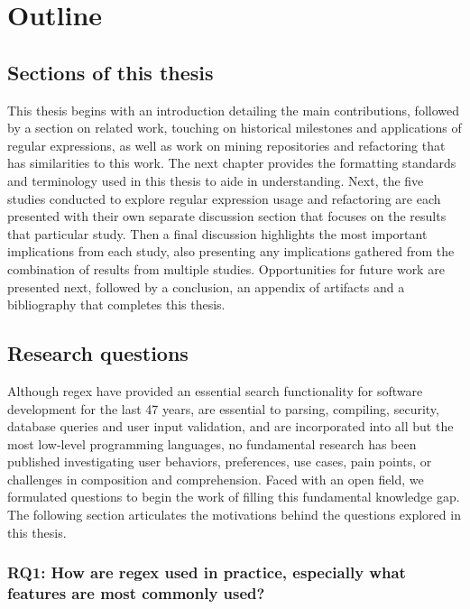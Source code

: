 \section{Outline}

\subsection{Sections of this thesis}
This thesis begins with an introduction detailing the main contributions, followed by a section on related work, touching on historical milestones and applications of regular expressions, as well as work on mining repositories and refactoring that has similarities to this work. The next chapter provides the formatting standards and terminology used in this thesis to aide in understanding.  Next, the five studies conducted to explore regular expression usage and refactoring are each presented with their own separate discussion section that focuses on the results that particular study.  Then a final discussion highlights the most important implications from each study, also presenting any implications gathered from the combination of results from multiple studies. Opportunities for future work are presented next, followed by a conclusion, an appendix of artifacts and a bibliography that completes this thesis.

\subsection{Research questions}

Although regex have provided an essential search functionality for software development for the last 47 years, are essential to parsing, compiling, security, database queries and user input validation, and are incorporated into all but the most low-level programming languages, no fundamental research has been published investigating user behaviors, preferences, use cases, pain points, or challenges in composition and comprehension.  Faced with an open field, we formulated  questions to begin the work of filling this fundamental knowledge gap.  The following section articulates the motivations behind the questions explored in this thesis.

\subsubsection{RQ1: How are regex used in practice, especially what features are most commonly used?}

